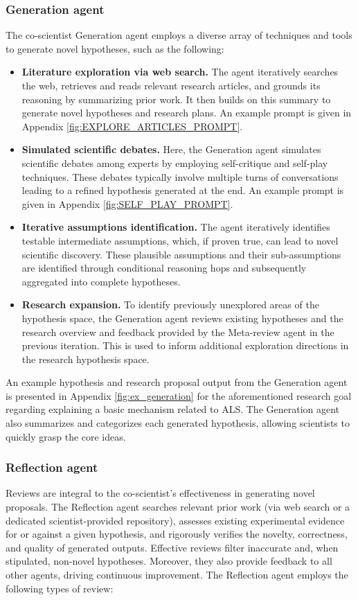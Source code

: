 \subsubsection{Generation agent}
The co-scientist Generation agent employs a diverse array of techniques and tools to generate novel hypotheses, such as the following:
\begin{itemize}
    \item \textbf{Literature exploration via web search.} The agent iteratively searches the web, retrieves and reads relevant research articles, and grounds its reasoning by summarizing prior work. It then builds on this summary to generate novel hypotheses and research plans. An example prompt is given in Appendix \cref{fig:EXPLORE_ARTICLES_PROMPT}.
    \item \textbf{Simulated scientific debates.} Here, the Generation agent simulates scientific debates among experts by employing self-critique and self-play techniques. These debates typically involve multiple turns of conversations leading to a refined hypothesis generated at the end.  An example prompt is given in  Appendix \cref{fig:SELF_PLAY_PROMPT}.
    \item \textbf{Iterative assumptions identification.} The agent iteratively identifies testable intermediate assumptions, which, if proven true, can lead to novel scientific discovery. These plausible assumptions and their sub-assumptions are identified through conditional reasoning hops and subsequently aggregated into complete hypotheses.
    \item \textbf{Research expansion.} To identify previously unexplored areas of the hypothesis space, the Generation agent reviews existing hypotheses and the research overview and feedback provided by the Meta-review agent in the previous iteration. This is used to inform additional exploration directions in the research hypothesis space.
\end{itemize}

An example hypothesis and research proposal output from the Generation agent is presented in Appendix \cref{fig:ex_generation} for the aforementioned research goal regarding explaining a basic mechanism related to ALS. The Generation agent also summarizes and categorizes each generated hypothesis, allowing scientists to quickly grasp the core ideas.


\subsubsection{Reflection agent}\label{sec:reflection_agent}
Reviews are integral to the co-scientist's effectiveness in generating novel proposals. The Reflection agent searches relevant prior work (via web search or a dedicated scientist-provided repository), assesses existing experimental evidence for or against a given hypothesis, and rigorously verifies the novelty, correctness, and quality of generated outputs. Effective reviews filter inaccurate and, when stipulated, non-novel hypotheses. Moreover, they also provide feedback to all other agents, driving continuous improvement. The Reflection agent employs the following types of review:

